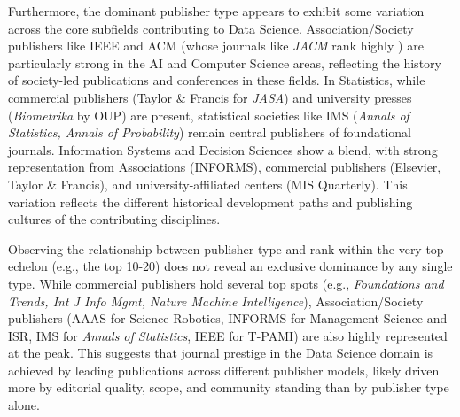 \documentclass[../main.tex]{subfiles}
\begin{document}
\vspace{0.2cm}
\noindent
Furthermore, the dominant publisher type appears to exhibit some variation across the core subfields contributing to Data Science. Association/Society publishers like IEEE and ACM (whose journals like \textit{JACM} rank highly ) are particularly strong in the AI and Computer Science areas, reflecting the history of society-led publications and conferences in these fields. In Statistics, while commercial publishers (Taylor \& Francis for \textit{JASA}) and university presses (\textit{Biometrika} by OUP) are present, statistical societies like IMS (\textit{Annals of Statistics, Annals of Probability}) remain central publishers of foundational journals. Information Systems and Decision Sciences show a blend, with strong representation from Associations (INFORMS), commercial publishers (Elsevier, Taylor \& Francis), and university-affiliated centers (MIS Quarterly). This variation reflects the different historical development paths and publishing cultures of the contributing disciplines.

\vspace{0.2cm}
\noindent
Observing the relationship between publisher type and rank within the very top echelon (e.g., the top 10-20) does not reveal an exclusive dominance by any single type. While commercial publishers hold several top spots (e.g., \textit{Foundations and Trends, Int J Info Mgmt, Nature Machine Intelligence}), Association/Society publishers (AAAS for Science Robotics, INFORMS for Management Science and ISR, IMS for \textit{Annals of Statistics}, IEEE for T-PAMI) are also highly represented at the peak. This suggests that journal prestige in the Data Science domain is achieved by leading publications across different publisher models, likely driven more by editorial quality, scope, and community standing than by publisher type alone.
\end{document}
